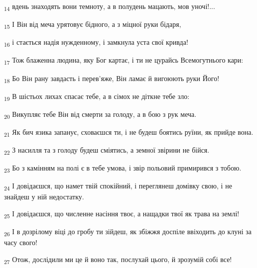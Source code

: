\begin{tcolorbox}
\textsubscript{14} вдень знаходять вони темноту, а в полудень мацають, мов уночі!...
\end{tcolorbox}
\begin{tcolorbox}
\textsubscript{15} І Він від меча урятовує бідного, а з міцної руки бідаря,
\end{tcolorbox}
\begin{tcolorbox}
\textsubscript{16} і стається надія нужденному, і замкнула уста свої кривда!
\end{tcolorbox}
\begin{tcolorbox}
\textsubscript{17} Тож блаженна людина, яку Бог картає, і ти не цурайсь Всемогутнього кари:
\end{tcolorbox}
\begin{tcolorbox}
\textsubscript{18} Бо Він рану завдасть і перев'яже, Він ламає й вигоюють руки Його!
\end{tcolorbox}
\begin{tcolorbox}
\textsubscript{19} В шістьох лихах спасає тебе, а в сімох не діткне тебе зло:
\end{tcolorbox}
\begin{tcolorbox}
\textsubscript{20} Викупляє тебе Він від смерти за голоду, а в бою з рук меча.
\end{tcolorbox}
\begin{tcolorbox}
\textsubscript{21} Як бич язика запанує, сховаєшся ти, і не будеш боятись руїни, як прийде вона.
\end{tcolorbox}
\begin{tcolorbox}
\textsubscript{22} З насилля та з голоду будеш сміятись, а земної звірини не бійся.
\end{tcolorbox}
\begin{tcolorbox}
\textsubscript{23} Бо з камінням на полі є в тебе умова, і звір польовий примирився з тобою.
\end{tcolorbox}
\begin{tcolorbox}
\textsubscript{24} І довідаєшся, що намет твій спокійний, і переглянеш домівку свою, і не знайдеш у ній недостатку.
\end{tcolorbox}
\begin{tcolorbox}
\textsubscript{25} І довідаєшся, що численне насіння твоє, а нащадки твої як трава на землі!
\end{tcolorbox}
\begin{tcolorbox}
\textsubscript{26} І в дозрілому віці до гробу ти зійдеш, як збіжжя доспіле ввіходить до клуні за часу свого!
\end{tcolorbox}
\begin{tcolorbox}
\textsubscript{27} Отож, дослідили ми це й воно так, послухай цього, й зрозумій собі все!
\end{tcolorbox}
